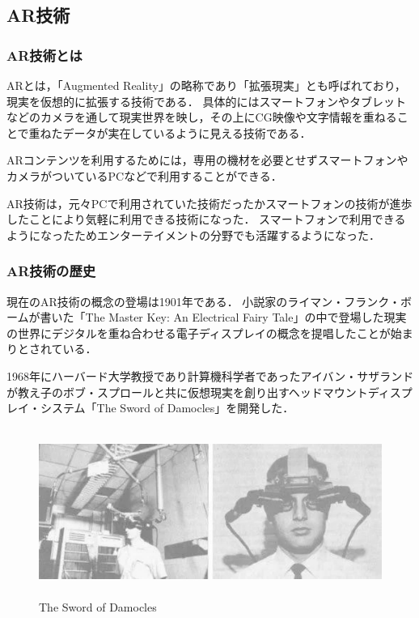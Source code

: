 \documentclass[12pt,a4j]{ltjsarticle}
\begin{document}
\subsection{AR技術}
\subsubsection{AR技術とは}
ARとは，「Augmented Reality」の略称であり「拡張現実」とも呼ばれており，現実を仮想的に拡張する技術である．
具体的にはスマートフォンやタブレットなどのカメラを通して現実世界を映し，その上にCG映像や文字情報を重ねることで重ねたデータが実在しているように見える技術である\cite{ARとは}．

ARコンテンツを利用するためには，専用の機材を必要とせずスマートフォンやカメラがついているPCなどで利用することができる．

AR技術は，元々PCで利用されていた技術だったかスマートフォンの技術が進歩したことにより気軽に利用できる技術になった．
スマートフォンで利用できるようになったためエンターテイメントの分野でも活躍するようになった．

\subsubsection{AR技術の歴史}
現在のAR技術の概念の登場は1901年である．
小説家のライマン・フランク・ボームが書いた「The Master Key: An Electrical Fairy Tale」の中で登場した現実の世界にデジタルを重ね合わせる電子ディスプレイの概念を提唱したことが始まりとされている．

1968年にハーバード大学教授であり計算機科学者であったアイバン・サザランドが教え子のボブ・スプロールと共に仮想現実を創り出すヘッドマウントディスプレイ・システム「The Sword of Damocles」を開発した．

\begin{figure}[h]
\begin{center}
 \includegraphics[clip,height=55mm]{The_Sword_of_Damocles.pdf}
\end{center}
 \caption{The Sword of Damocles}
 \label{fig:The_Sword_of_Damocles.pdf}
\end{figure}
\end{document}
